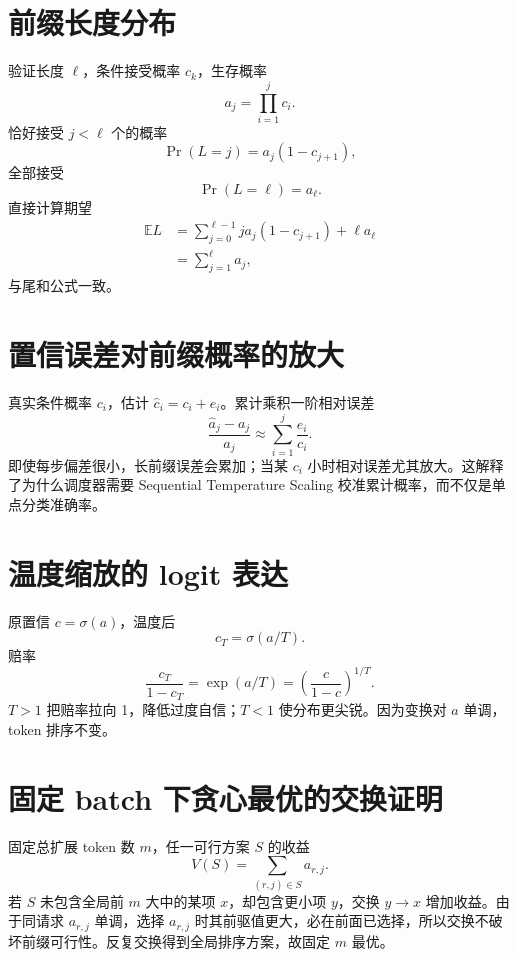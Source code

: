 \documentclass[UTF8,12pt,a4paper,fontset=none]{ctexart}
\numberwithin{equation}{section}
\newcommand{\E}{\mathbb{E}}
\begin{document}
\section{前缀长度分布}
验证长度 $\ell$，条件接受概率 $c_k$，生存概率
\begin{equation}
 a_j=\prod_{i=1}^{j}c_i.
\end{equation}
恰好接受 $j<\ell$ 个的概率
\begin{equation}
 \Pr(L=j)=a_j(1-c_{j+1}),
\end{equation}
全部接受
\begin{equation}
 \Pr(L=\ell)=a_\ell.
\end{equation}
直接计算期望
\begin{align}
 \E L
 &=\sum_{j=0}^{\ell-1}j a_j(1-c_{j+1})+\ell a_\ell\\
 &=\sum_{j=1}^{\ell}a_j,
\end{align}
与尾和公式一致。

\section{置信误差对前缀概率的放大}
真实条件概率 $c_i$，估计 $\widehat c_i=c_i+e_i$。累计乘积一阶相对误差
\begin{equation}
 \frac{\widehat a_j-a_j}{a_j}
 \approx\sum_{i=1}^{j}\frac{e_i}{c_i}.
\end{equation}
即使每步偏差很小，长前缀误差会累加；当某 $c_i$ 小时相对误差尤其放大。这解释了为什么调度器需要 Sequential Temperature Scaling 校准累计概率，而不仅是单点分类准确率。

\section{温度缩放的 logit 表达}
原置信 $c=\sigma(a)$，温度后
\begin{equation}
 c_T=\sigma(a/T).
\end{equation}
赔率
\begin{equation}
 \frac{c_T}{1-c_T}
 =\exp(a/T)
 =\left(\frac{c}{1-c}\right)^{1/T}.
\end{equation}
$T>1$ 把赔率拉向 1，降低过度自信；$T<1$ 使分布更尖锐。因为变换对 $a$ 单调，token 排序不变。

\section{固定 batch 下贪心最优的交换证明}
固定总扩展 token 数 $m$，任一可行方案 $S$ 的收益
\begin{equation}
 V(S)=\sum_{(r,j)\in S}a_{r,j}.
\end{equation}
若 $S$ 未包含全局前 $m$ 大中的某项 $x$，却包含更小项 $y$，交换 $y\to x$ 增加收益。由于同请求 $a_{r,j}$ 单调，选择 $a_{r,j}$ 时其前驱值更大，必在前面已选择，所以交换不破坏前缀可行性。反复交换得到全局排序方案，故固定 $m$ 最优。
\end{document}
